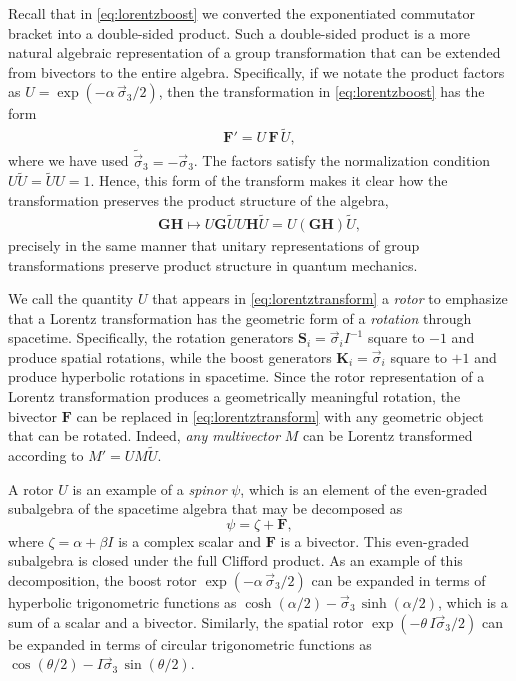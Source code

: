 \documentclass[1p,sort&compress]{elsarticle}
\numberwithin{equation}{section}
\newcommand{\rv}[1]{\vec{#1}}
\newcommand{\bv}[1]{\mathbf{#1}}
\begin{document}
Recall that in \eqref{eq:lorentzboost} we converted the exponentiated commutator bracket into a double-sided product.  Such a double-sided product is a more natural algebraic representation of a group transformation that can be extended from bivectors to the entire algebra.  Specifically, if we notate the product factors as $U = \exp(-\alpha\,\rv{\sigma}_3/2)$, then the transformation in \eqref{eq:lorentzboost} has the form
\begin{align}\label{eq:lorentztransform}
  \bv{F}' = U\,\bv{F}\,\widetilde{U},
\end{align}
where we have used $\widetilde{\rv{\sigma}}_3 = -\rv{\sigma}_3$.  The factors satisfy the normalization condition $U\widetilde{U} = \widetilde{U}U = 1$.  Hence, this form of the transform makes it clear how the transformation preserves the product structure of the algebra, 
\begin{align}
  \bv{GH} \mapsto U\bv{G}\widetilde{U}U\bv{H}\widetilde{U} = U(\bv{GH})\widetilde{U},
\end{align}
precisely in the same manner that unitary representations of group transformations preserve product structure in quantum mechanics.

We call the quantity $U$ that appears in \eqref{eq:lorentztransform} a \emph{rotor} to emphasize that a Lorentz transformation has the geometric form of a \emph{rotation} through spacetime.  Specifically, the rotation generators $\bv{S}_i = \rv{\sigma}_i I^{-1}$ square to $-1$ and produce spatial rotations, while the boost generators $\bv{K}_i = \rv{\sigma}_i$ square to $+1$ and produce hyperbolic rotations in spacetime.  Since the rotor representation of a Lorentz transformation produces a geometrically meaningful rotation, the bivector $\bv{F}$ can be replaced in \eqref{eq:lorentztransform} with any geometric object that can be rotated.  Indeed, \emph{any multivector} $M$ can be Lorentz transformed according to $M' = U M \widetilde{U}$.

A rotor $U$ is an example of a \emph{spinor} $\psi$, which is an element of the even-graded subalgebra of the spacetime algebra \cite{Crumeyrolle1990} that may be decomposed as  
\begin{equation}
  \psi = \zeta + \bv{F}, 
\end{equation}
where $\zeta = \alpha + \beta I$ is a complex scalar and $\bv{F}$ is a bivector.  This even-graded subalgebra is closed under the full Clifford product.  As an example of this decomposition, the boost rotor $\exp(-\alpha\, \rv{\sigma}_3/2)$ can be expanded in terms of hyperbolic trigonometric functions as $\cosh(\alpha/2) - \rv{\sigma}_3\,\sinh(\alpha/2)$, which is a sum of a scalar and a bivector.  Similarly, the spatial rotor $\exp(-\theta\,I\rv{\sigma}_3/2)$ can be expanded in terms of circular trigonometric functions as $\cos(\theta/2) - I\rv{\sigma}_3\,\sin(\theta/2)$.
\end{document}
